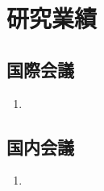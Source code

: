 \documentclass[12pt]{jarticle} %
\title{}
\author{}
\begin{document}
\titlepage
\cmemberspage
\firstabstract

\toc
\newpage
\listoffigures
\listoftables










\newpage



\clearpage
\section*{研究業績}

\subsection*{国際会議}
\begin{enumerate}
\item 
\end{enumerate}


\subsection*{国内会議}
\begin{enumerate}
\item 
\end{enumerate}
\end{document}

